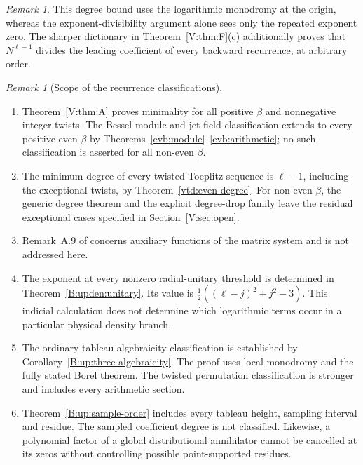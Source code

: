 \documentclass[11pt,a4paper]{article}
\theoremstyle{definition}
\theoremstyle{remark}
\newtheorem{remark}[theorem]{Remark}
\numberwithin{equation}{section}
\begin{document}
\begin{remark}
This degree bound uses the logarithmic monodromy at the origin, whereas
the exponent-divisibility argument alone sees only the repeated
exponent zero. The sharper dictionary in Theorem~\ref{V:thm:F}(c) additionally proves that $N^{\ell-1}$ divides the leading coefficient of every backward recurrence, at arbitrary order.
\end{remark}

\begin{remark}[Scope of the recurrence classifications]
\begin{enumerate}
\item Theorem~\ref{V:thm:A} proves minimality for all positive $\beta$
and nonnegative integer twists. The Bessel-module and jet-field
classification extends to every positive even $\beta$ by
Theorems~\ref{evb:module}--\ref{evb:arithmetic}; no such classification
is asserted for all non-even $\beta$.
\item The minimum degree of every twisted Toeplitz sequence is
$\ell-1$, including the exceptional twists, by
Theorem~\ref{vtd:even-degree}. For non-even $\beta$, the generic
degree theorem and the explicit degree-drop family leave the residual
exceptional cases specified in Section~\ref{V:sec:open}.
\item Remark~A.9 of \cite{FW26} concerns auxiliary functions of the matrix system and is not addressed here.
\item The exponent at every nonzero radial-unitary threshold is determined in Theorem~\ref{B:upden:unitary}. Its value is $\frac12((\ell-j)^2+j^2-3)$. This indicial calculation does not determine which logarithmic terms occur in a particular physical density branch.
\item The ordinary tableau algebraicity classification is established by
Corollary~\ref{B:up:three-algebraicity}. The proof uses local monodromy and
the fully stated Borel theorem. The twisted permutation classification
is stronger and includes every arithmetic section.
\item Theorem~\ref{B:up:sample-order} includes every tableau height,
sampling interval and residue. The sampled coefficient degree is not
classified. Likewise, a polynomial factor of a global distributional
annihilator cannot be cancelled at its zeros without controlling possible
point-supported residues.
\end{enumerate}
\end{remark}
\end{document}
